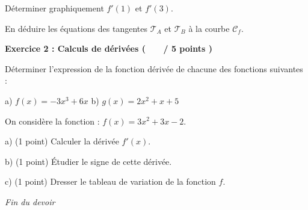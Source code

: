 \documentclass[12pt,a4paper]{exam}
\begin{document}
\begin{questions}

\question[2] Déterminer graphiquement $f'(1)$ et $f'(3)$.

\question[3] En déduire les équations des tangentes $\mathcal{T}_A$ et $\mathcal{T}_B$ à 
la courbe $\mathcal{C}_f$.

\end{questions}

\vspace{1cm}

\noindent
\textbf{Exercice 2 : Calculs de dérivées ( \ \ \ / 5 points )}

\vspace{10pt}
\noindent

\begin{questions}

\question[2] Déterminer l'expression de la fonction dérivée de chacune des fonctions suivantes :

\vspace{5pt}
\hspace{1cm}a) $f(x) = -3x^3 + 6x$ \hspace{1cm}b) $g(x) = 2x^2 + x + 5$

\vspace{10pt}

\question On considère la fonction : $f(x) = 3x^2 + 3x - 2$.

\vspace{5pt}
\hspace{1cm}a) (1 point) Calculer la dérivée $f'(x)$.

\vspace{5pt}
\hspace{1cm}b) (1 point) Étudier le signe de cette dérivée.

\vspace{5pt}
\hspace{1cm}c) (1 point) Dresser le tableau de variation de la fonction $f$.

\end{questions}

\vspace{0.5cm}

\begin{center}
    \textit{Fin du devoir}
\end{center}
\end{document}
